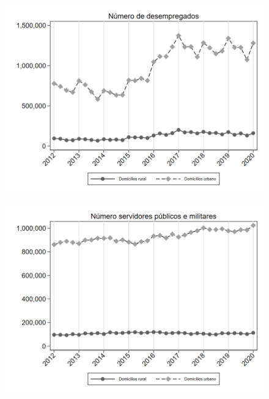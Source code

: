 \begin{frame}[label=_composicao_demografica_rural_urbano_n_de_desemprego]{}
\textit{\hyperlink{_composicao_demografica_rural_urbano}{}}
\begin{figure}
  \centering
  \includegraphics[width=1.0\linewidth]{../../analysis/output/composicao_demografica/area_geografica/_composicao_demografica_rural_urbano_n_de_desemprego.png}
  \caption{}
  \label{fig:_composicao_demografica_rural_urbano_n_de_desemprego}
\end{figure}
\end{frame}


\begin{frame}[label=_composicao_demografica_rural_urbano_n_militar]{}
\textit{\hyperlink{_composicao_demografica_rural_urbano}{}}
\begin{figure}
  \centering
  \includegraphics[width=1.0\linewidth]{../../analysis/output/composicao_demografica/area_geografica/_composicao_demografica_rural_urbano_n_militar.png}
  \caption{}
  \label{fig:_composicao_demografica_rural_urbano_n_militar}
\end{figure}
\end{frame}


